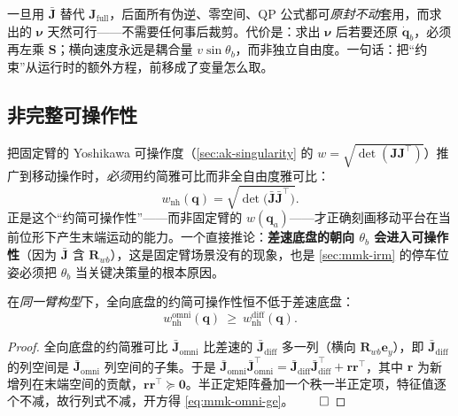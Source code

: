 \begin{insight}
一旦用 $\bar{\mathbf{J}}$ 替代 $\mathbf{J}_{\text{full}}$，后面所有伪逆、零空间、QP 公式都可\emph{原封不动}套用，而求出的 $\boldsymbol{\nu}$ 天然可行——不需要任何事后裁剪。代价是：求出 $\boldsymbol{\nu}$ 后若要还原 $\dot{\mathbf{q}}_b$，必须再左乘 $\mathbf{S}$；横向速度永远是耦合量 $v\sin\theta_b$，而非独立自由度。一句话：把“约束”从运行时的额外方程，前移成了变量怎么取。
\end{insight}

\subsection{非完整可操作性}
\label{sec:mmk-wnh}

把固定臂的 Yoshikawa 可操作度（\cref{sec:ak-singularity} 的 $w=\sqrt{\det(\mathbf{J}\mathbf{J}^\top)}$）推广到移动操作时，\emph{必须}用约简雅可比而非全自由度雅可比：
\begin{equation}
  w_{\text{nh}}(\mathbf{q})=\sqrt{\det\!\big(\bar{\mathbf{J}}\bar{\mathbf{J}}^\top\big)}.
  \label{eq:mmk-wnh}
\end{equation}
正是这个“约简可操作性”——而非固定臂的 $w(\mathbf{q}_a)$——才正确刻画移动平台在当前位形下产生末端运动的能力。一个直接推论：\textbf{差速底盘的朝向 $\theta_b$ 会进入可操作性}（因为 $\bar{\mathbf{J}}$ 含 $\mathbf{R}_{wb}$），这是固定臂场景没有的现象，也是 \cref{sec:mmk-irm} 的停车位姿必须把 $\theta_b$ 当关键决策量的根本原因。

\begin{proposition}[全向不劣于差速]\label{prop:mmk-omni-ge-diff}
在\emph{同一臂构型}下，全向底盘的约简可操作性恒不低于差速底盘：
\begin{equation}
  w_{\text{nh}}^{\text{omni}}(\mathbf{q})\ \ge\ w_{\text{nh}}^{\text{diff}}(\mathbf{q}).
  \label{eq:mmk-omni-ge}
\end{equation}
\end{proposition}
\begin{proof}
全向底盘的约简雅可比 $\bar{\mathbf{J}}_{\text{omni}}$ 比差速的 $\bar{\mathbf{J}}_{\text{diff}}$ 多一列（横向 $\mathbf{R}_{wb}\mathbf{e}_y$），即 $\bar{\mathbf{J}}_{\text{diff}}$ 的列空间是 $\bar{\mathbf{J}}_{\text{omni}}$ 列空间的子集。于是 $\bar{\mathbf{J}}_{\text{omni}}\bar{\mathbf{J}}_{\text{omni}}^\top=\bar{\mathbf{J}}_{\text{diff}}\bar{\mathbf{J}}_{\text{diff}}^\top+\mathbf{r}\mathbf{r}^\top$，其中 $\mathbf{r}$ 为新增列在末端空间的贡献，$\mathbf{r}\mathbf{r}^\top\succeq\mathbf{0}$。半正定矩阵叠加一个秩一半正定项，特征值逐个不减，故行列式不减，开方得 \cref{eq:mmk-omni-ge}。$\qed$
\end{proof}

